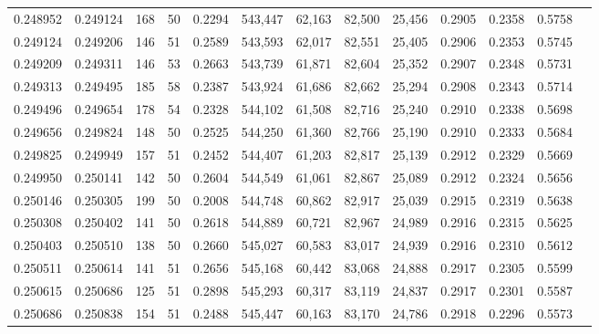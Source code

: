 \begin{tabular}{rrrrrrrrrrrrr}
0.248952 & 0.249124 &   168 &  50 &                                     0.2294 & 543,447 &  62,163 &  82,500 &  25,456 & 0.2905 & 0.2358 & 0.5758 \\
0.249124 & 0.249206 &   146 &  51 &                                     0.2589 & 543,593 &  62,017 &  82,551 &  25,405 & 0.2906 & 0.2353 & 0.5745 \\
0.249209 & 0.249311 &   146 &  53 &                                     0.2663 & 543,739 &  61,871 &  82,604 &  25,352 & 0.2907 & 0.2348 & 0.5731 \\
0.249313 & 0.249495 &   185 &  58 &                                     0.2387 & 543,924 &  61,686 &  82,662 &  25,294 & 0.2908 & 0.2343 & 0.5714 \\
0.249496 & 0.249654 &   178 &  54 &                                     0.2328 & 544,102 &  61,508 &  82,716 &  25,240 & 0.2910 & 0.2338 & 0.5698 \\
0.249656 & 0.249824 &   148 &  50 &                                     0.2525 & 544,250 &  61,360 &  82,766 &  25,190 & 0.2910 & 0.2333 & 0.5684 \\
0.249825 & 0.249949 &   157 &  51 &                                     0.2452 & 544,407 &  61,203 &  82,817 &  25,139 & 0.2912 & 0.2329 & 0.5669 \\
0.249950 & 0.250141 &   142 &  50 &                                     0.2604 & 544,549 &  61,061 &  82,867 &  25,089 & 0.2912 & 0.2324 & 0.5656 \\
0.250146 & 0.250305 &   199 &  50 &                                     0.2008 & 544,748 &  60,862 &  82,917 &  25,039 & 0.2915 & 0.2319 & 0.5638 \\
0.250308 & 0.250402 &   141 &  50 &                                     0.2618 & 544,889 &  60,721 &  82,967 &  24,989 & 0.2916 & 0.2315 & 0.5625 \\
0.250403 & 0.250510 &   138 &  50 &                                     0.2660 & 545,027 &  60,583 &  83,017 &  24,939 & 0.2916 & 0.2310 & 0.5612 \\
0.250511 & 0.250614 &   141 &  51 &                                     0.2656 & 545,168 &  60,442 &  83,068 &  24,888 & 0.2917 & 0.2305 & 0.5599 \\
0.250615 & 0.250686 &   125 &  51 &                                     0.2898 & 545,293 &  60,317 &  83,119 &  24,837 & 0.2917 & 0.2301 & 0.5587 \\
0.250686 & 0.250838 &   154 &  51 &                                     0.2488 & 545,447 &  60,163 &  83,170 &  24,786 & 0.2918 & 0.2296 & 0.5573 \\

\end{tabular}
